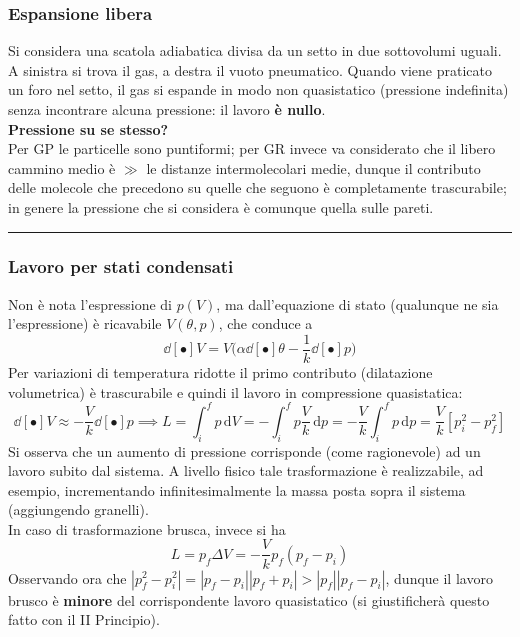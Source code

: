 \documentclass[10pt, oneside]{book}
\newcommand{\infobox}[2]{\vspace{0.5cm}~\\ \textbf{#1} \hrulefill \vspace{0.2cm}\\#2 {}\,\\\hrule \vspace{0.5cm}}
\newcommand{\ds}{\displaystyle}
\newcommand{\integral}[4]{\int_{#1}^{#2} #3 \, \mathrm{d}#4}
\begin{document}
\subsubsection*{Espansione libera}
Si considera una scatola adiabatica divisa da un setto in due sottovolumi uguali. A sinistra si trova il gas, a destra il vuoto pneumatico. Quando viene praticato un foro nel setto, il gas si espande in modo non quasistatico (pressione indefinita) senza incontrare alcuna pressione: il lavoro \textbf{è nullo}.
\infobox{Pressione su se stesso?}{Per GP le particelle sono puntiformi; per GR invece va considerato che il libero cammino medio è $\gg$ le distanze intermolecolari medie, dunque il contributo delle molecole che precedono su quelle che seguono è completamente trascurabile; in genere la pressione che si considera è comunque quella sulle pareti.}

\subsubsection*{Lavoro per stati condensati}
Non è nota l'espressione di $p(V)$, ma dall'equazione di stato (qualunque ne sia l'espressione) è ricavabile $V(\theta, p)$, che conduce a 
\[\dd[•]{V} = V \bigg(\alpha \dd[•]{\theta} - \frac{1}{k} \dd[•]{p}\bigg)\]
Per variazioni di temperatura ridotte il primo contributo (dilatazione volumetrica) è trascurabile e quindi il lavoro in compressione quasistatica:
\[\dd[•]{V} \approx - \frac{V}{k} \dd[•]{p} \implies L = \integral{i}{f}{p}{V} = - \integral{i}{f}{p \frac{V}{k}}{p} = - \frac{V}{k} \integral{i}{f}{p}{p} = \frac{V}{k} [p_i^2 - p_f^2]\]
Si osserva che un aumento di pressione corrisponde (come ragionevole) ad un lavoro subito dal sistema. A livello fisico tale trasformazione è realizzabile, ad esempio, incrementando infinitesimalmente la massa posta sopra il sistema (aggiungendo granelli).\\
In caso di trasformazione brusca, invece si ha
\[L = p_f \Delta V = -\frac{V}{k} p_f (p_f - p_i)\]
Osservando ora che $\ds |p_f^2 - p_i^2| = |p_f - p_i| |p_f + p_i| > |p_f| |p_f - p_i|$, dunque il lavoro brusco è \textbf{minore} del corrispondente lavoro quasistatico (si giustificherà questo fatto con il II Principio).
\end{document}
